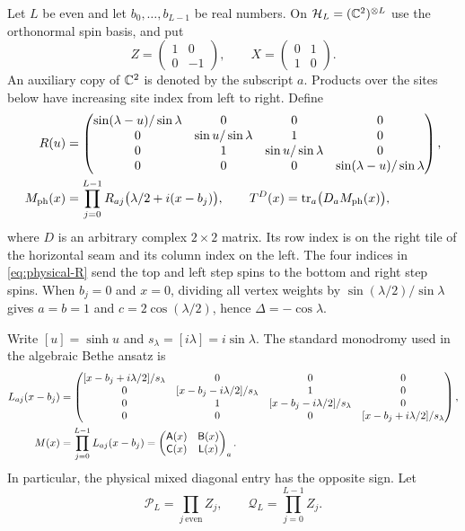 Let $L$ be even and let $b_0,\ldots,b_{L-1}$ be real numbers.  On
$\mathcal H_L=(\mathbb C^2)^{\otimes L}$ use the orthonormal spin basis, and put
\[
 Z=\begin{pmatrix}1&0\\0&-1\end{pmatrix},\qquad
 X=\begin{pmatrix}0&1\\1&0\end{pmatrix}.
\]
An auxiliary copy of $\mathbb C^2$ is denoted by the subscript $a$.  Products
over the sites below have increasing site index from left to right.  Define
\begin{align}
 R(u)&=
 \begin{pmatrix}
 \sin(\lambda-u)/\sin\lambda&0&0&0\\
 0&\sin u/\sin\lambda&1&0\\
 0&1&\sin u/\sin\lambda&0\\
 0&0&0&\sin(\lambda-u)/\sin\lambda
 \end{pmatrix},\label{eq:physical-R}\\
 M_{\rm ph}(x)&=\prod_{j=0}^{L-1}
 R_{aj}\bigl(\lambda/2+i(x-b_j)\bigr),\qquad
 T^D(x)=\operatorname{tr}_a\bigl(D_aM_{\rm ph}(x)\bigr),\label{eq:physical-row}
\end{align}
where $D$ is an arbitrary complex $2\times2$ matrix.  Its row index is
on the right tile of the horizontal seam and its column index on the
left.  The four indices in \eqref{eq:physical-R} send the top and left
step spins to the bottom and right step spins.  When $b_j=0$ and $x=0$,
dividing all vertex weights by $\sin(\lambda/2)/\sin\lambda$ gives
$a=b=1$ and $c=2\cos(\lambda/2)$, hence $\Delta=-\cos\lambda$.

Write $[u]=\sinh u$ and $s_\lambda=[i\lambda]=i\sin\lambda$.
The standard monodromy used in the algebraic Bethe ansatz is
\begin{align}
 L_{aj}(x-b_j)&=
 \begin{pmatrix}
 [x-b_j+i\lambda/2]/s_\lambda&0&0&0\\
 0&[x-b_j-i\lambda/2]/s_\lambda&1&0\\
 0&1&[x-b_j-i\lambda/2]/s_\lambda&0\\
 0&0&0&[x-b_j+i\lambda/2]/s_\lambda
 \end{pmatrix},\notag\\
 M(x)&=\prod_{j=0}^{L-1}L_{aj}(x-b_j)
      =\begin{pmatrix}\mathsf A(x)&\mathsf B(x)\\
                         \mathsf C(x)&\mathsf L(x)\end{pmatrix}_a.
 \label{eq:standard-monodromy}
\end{align}
In particular, the physical mixed diagonal entry has the opposite sign.
Let
\begin{equation}\label{eq:parity-gauges}
 \mathcal P_L=\prod_{j\ {\mathrm{even}}}Z_j,
 \qquad \mathcal Q_L=\prod_{j=0}^{L-1}Z_j.
\end{equation}

